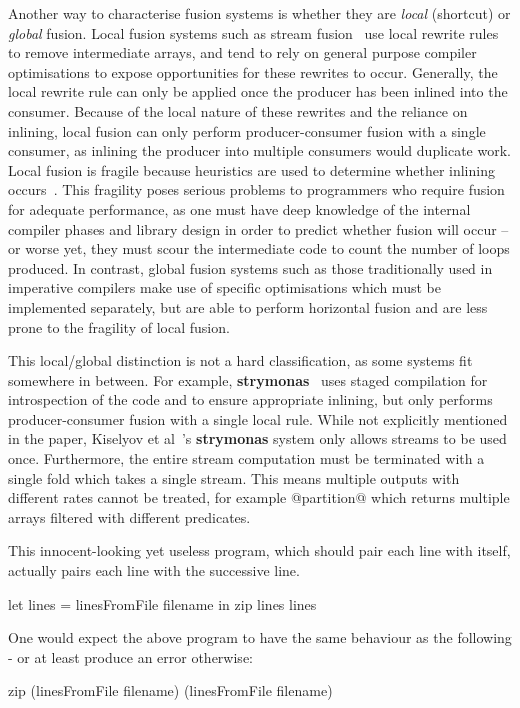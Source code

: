 Another way to characterise fusion systems is whether they are \emph{local} (shortcut) or \emph{global} fusion.
Local fusion systems such as stream fusion~\cite{coutts2007stream} use local rewrite rules to remove intermediate arrays, and tend to rely on general purpose compiler optimisations to expose opportunities for these rewrites to occur.
Generally, the local rewrite rule can only be applied once the producer has been inlined into the consumer.
Because of the local nature of these rewrites and the reliance on inlining, local fusion can only perform producer-consumer fusion with a single consumer, as inlining the producer into multiple consumers would duplicate work.
Local fusion is fragile because heuristics are used to determine whether inlining occurs~\cite{lippmeier2013data}.
This fragility poses serious problems to programmers who require fusion for adequate performance, as one must have deep knowledge of the internal compiler phases and library design in order to predict whether fusion will occur -- or worse yet, they must scour the intermediate code to count the number of loops produced. 
In contrast, global fusion systems such as those traditionally used in imperative compilers make use of specific optimisations which must be implemented separately, but are able to perform horizontal fusion and are less prone to the fragility of local fusion.

This local/global distinction is not a hard classification, as some systems fit somewhere in between.
For example, {\bf strymonas}~\cite{kiselyov2016stream} uses staged compilation for introspection of the code and to ensure appropriate inlining, but only performs producer-consumer fusion with a single local rule.
While not explicitly mentioned in the paper, Kiselyov et al~\cite{kiselyov2016stream}'s {\bf strymonas} system only allows streams to be used once.
Furthermore, the entire stream computation must be terminated with a single fold which takes a single stream.
This means multiple outputs with different rates cannot be treated, for example @partition@ which returns multiple arrays filtered with different predicates.

This innocent-looking yet useless program, which should pair each line with itself, actually pairs each line with the successive line.
\begin{code}
let lines = linesFromFile filename
in  zip lines lines
\end{code}

One would expect the above program to have the same behaviour as the following - or at least produce an error otherwise:
\begin{code}
zip (linesFromFile filename) (linesFromFile filename)
\end{code}


